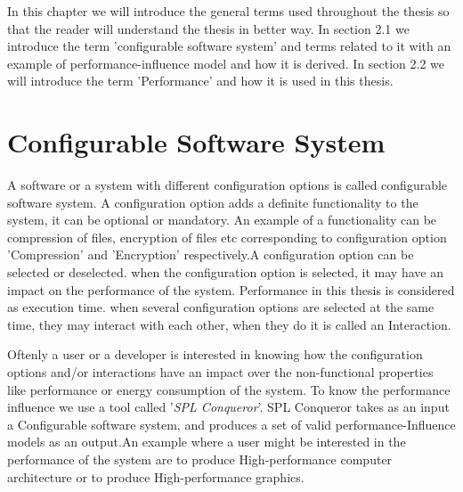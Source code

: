\label{background}


 
In this chapter we will introduce the general terms used throughout the thesis so that the reader will understand the thesis in better way. In section 2.1 we introduce the term 'configurable software system' and terms related to it with an example of performance-influence model and how it is derived. In section 2.2 we will introduce the term 'Performance' and how it is used in this thesis.

\section{Configurable Software System}
A software or a system with different configuration options is called configurable software system. A configuration option adds a definite functionality to the system, it can be optional or mandatory. An example of a functionality can be compression of files, encryption of files etc corresponding to configuration option 'Compression' and 'Encryption' respectively.A configuration option can be selected or deselected. when the configuration option is selected, it may have an impact on the performance of the system. Performance in this thesis is considered as execution time.
when several configuration options are selected at the same time, they may interact with each other, when they do it is called an Interaction.


Oftenly a user or a developer is interested in knowing how the configuration options and/or interactions have an impact over the non-functional properties like performance or energy consumption of the system. To know the performance influence we use a tool called '\textit{SPL Conqueror}'.
SPL Conqueror takes as an input a Configurable software system, and produces a set of valid performance-Influence models as an output.An example where a user might be interested in the performance of the system are to produce High-performance computer architecture or to produce High-performance graphics.

